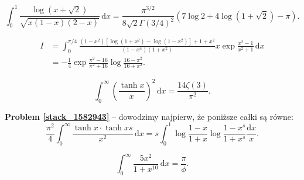 
\begin{problem}[pytanie 570997]
    \label{stack_570997}%
    \begin{equation}
        \int_0^1 \frac{\log (x + \sqrt 2)}{\sqrt{x(1-x)(2-x)}} \,\mathrm{d}x = \frac{\pi^{3/2}}{8\sqrt{2} \Gamma(3/4)^2 } \left(7 \log 2 + 4 \log (1 + \sqrt 2) - \pi \right).
    \end{equation}
\end{problem}


\begin{problem}[pytanie 815863]
    \label{stack_815863}%
    \begin{align}
        I & = \int_0^{\pi/4} \frac{ (1-x^2) [ \log(1+x^2) - \log(1 - x^2)] + 1 + x^2}{(1-x^4)(1+x^2)} x \exp \frac {x^2 - 1}{x^2 + 1} \,\mathrm{d} x \\
        & =  - \frac 1 4  \exp \frac{\pi^2 - 16}{\pi^2 + 16} \log \frac {16 - \pi^2}{16 + \pi^2}.
    \end{align}
\end{problem}




\begin{problem_with_solution}[pytanie 1582943]
    \label{stack_1582943}%
    \begin{equation}
        \int_0^\infty \left(\frac{\tanh x}{x}\right)^2 \,\mathrm{d}x = \frac{14 \zeta (3)}{\pi^2}.
    \end{equation}
\end{problem_with_solution}

\textbf{Problem \ref{stack_1582943}} -- dowodzimy najpierw, że poniższe całki są równe:
\begin{equation}
    \frac{\pi^2}{4} \int_0^\infty \frac{\tanh x \cdot \tanh xs}{x^2} \,\mathrm{d}x = s \int_0^1 \log \frac{1-x}{1+x} \log \frac{1-x^s}{1+x^s} \frac{\mathrm{d}x}{x}.
\end{equation}


\begin{problem}[pytanie 1653979]
    \label{stack_1653979}%
    \begin{equation}
        \int_0^\infty \frac{5x^2}{1  + x^{10}} \,\mathrm{d}x = \frac{\pi}{\phi}.
    \end{equation}
\end{problem}

